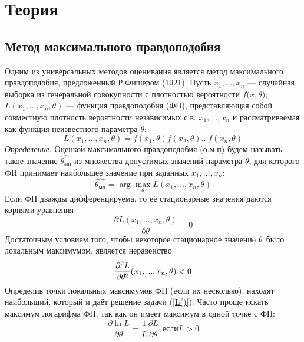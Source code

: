 \documentclass[12pt,a4paper]{scrartcl}
\begin{document}
\section{Теория}

\subsection{Метод максимального правдоподобия}
	Одним из универсальных методов оценивания является метод максимального правдоподобия, предложенный Р.Фишером (1921).
    Пусть $x_{1},...,x_{n}$ — случайная выборка из генеральной совокупности с плотностью вероятности $f(x,\theta$); $L(x_{1},... ,x_{n}, \theta)$ — функция правдоподобия (ФП), представляющая собой совместную плотность вероятности независимых с.в. $x_{1}, ... ,x_{n}$ и рассматриваемая как функция неизвестного параметра $\theta$:
    \begin{equation}
        L(x_{1},...,x_{n},\theta) = f(x_{1},\theta)f(x_{2},\theta)...f(x_{n}, \theta)
        \label{L()}
    \end{equation}
    \textit{Определение}. Оценкой максимального правдоподобия (о.м.п) будем называть такое значение $\hat{\theta_{мп}}$ из множества допустимых значений параметра $\theta$, для которого ФП принимает наибольшее значение при заданных $x_{1},...,x_{n}$:
    \begin{equation}
        \hat{\theta_{мп}} = \arg \max_{\theta}L(x_{1},...,x_{n},\theta)
        \label{theta_mp}
    \end{equation}
    Если ФП дважды дифференцируема, то её стационарные значения даются корнями уравнения
    \begin{equation}
        \frac{\partial L(x_{1},...,x_{n},\theta)}{\partial \theta} = 0
        \label{eq_min}
    \end{equation}
    Достаточным условием того, чтобы некоторое стационарное значениe $\Tilde{\theta}$ было локальным максимумом, является неравенство
    \begin{equation}
        \frac{\partial^{2}L}{\partial \theta^{2}}(x_{1},...,x_{n},\Tilde{\theta}) < 0
        \label{ineq_min}
    \end{equation}
    Определив точки локальных максимумов ФП (если их несколько), находят наибольший, который и даёт решение задачи (\ref{L()}).
    Часто проще искать максимум логарифма ФП, так как он имеет максимум в одной точке с ФП:
    \begin{equation}
        \frac{\partial \ln L}{\partial \theta}=\frac{1}{L}\frac{\partial L}{\partial \theta}, если L > 0
        \label{log_max}
    \end{equation}
\end{document}
